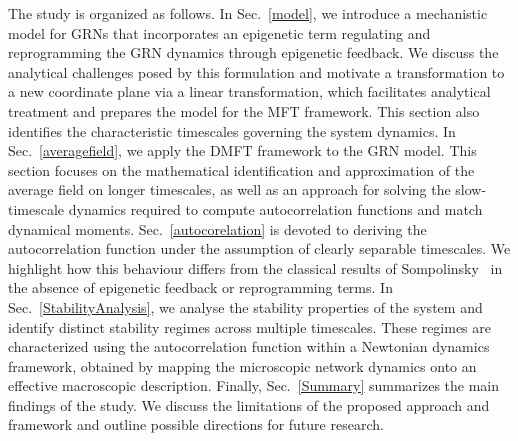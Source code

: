\documentclass[reprint,amsmath,amssymb,aps]{revtex4-2}
\begin{document}


The study is organized as follows. In Sec.~\ref{model}, we introduce a mechanistic model for GRNs that incorporates an epigenetic term regulating and reprogramming the GRN dynamics through epigenetic feedback. We discuss the analytical challenges posed by this formulation and motivate a transformation to a new coordinate plane via a linear transformation, which facilitates analytical treatment and prepares the model for the MFT framework. This section also identifies the characteristic timescales governing the system dynamics. In Sec.~\ref{averagefield}, we apply the DMFT framework to the GRN model. This section focuses on the mathematical identification and approximation of the average field on longer timescales, as well as an approach for solving the slow-timescale dynamics required to compute autocorrelation functions and match dynamical moments. Sec.~\ref{autocorelation} is devoted to deriving the autocorrelation function under the assumption of clearly separable timescales. We highlight how this behaviour differs from the classical results of Sompolinsky~\cite{Sompolinsky1988} in the absence of epigenetic feedback or reprogramming terms. In Sec.~\ref{StabilityAnalysis}, we analyse the stability properties of the system and identify distinct stability regimes across multiple timescales. These regimes are characterized using the autocorrelation function within a Newtonian dynamics framework, obtained by mapping the microscopic network dynamics onto an effective macroscopic description. Finally, Sec.~\ref{Summary} summarizes the main findings of the study. We discuss the limitations of the proposed approach and framework and outline possible directions for future research.
\end{document}
